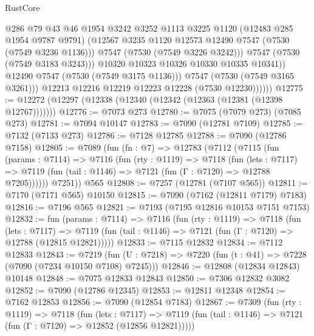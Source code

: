 \begin{lexlean}{RustCore}
\begin{coremodule}
                          @286
                          @79
                          @43
                          @46
                          @1954
                          @3242
                          @3252
                          @1113
                          @3225
                          @1120
                          (@12483 @285 @1954 @9787 @9791)
                          (@12567 @3235 @1120 @12573 @12490 @7547 (@7530 (@7549 @3236 @1136)))
                          @7547
                          (@7530 (@7549 @3226 @3242)))
                        @7547
                        (@7530 (@7549 @3183 @3243)))
                      @10320
                      @10323
                      @10326
                      @10330
                      @10335
                      @10341))
                  @12490
                  @7547
                  (@7530 (@7549 @3175 @1136)))
                @7547
                (@7530 (@7549 @3165 @3261)))
              @12213
              @12216
              @12219
              @12223
              @12228
              (@7530 @12230))))))
@12775 := @12272 (@12297 (@12338 (@12340 (@12342 (@12363 (@12381 (@12398 @12767)))))))
@12776 := @7073 @273
@12780 := @7075 (@7079 @273) (@7085 @273)
@12781 := @7094 @10147
@12783 := @7090 (@12781 @7109)
@12785 := @7132 (@7133 @273)
@12786 := @7128 @12785
@12788 := @7090 (@12786 @7158)
@12805 := @7089
    (fun (fn : @7) =>
    @12783
      (@7112
        (@7115
          (fun (params : @7114) =>
          @7116
            (fun (rty : @1119) =>
            @7118
              (fun (lets : @7117) =>
              @7119 (fun (tail : @1146) => @7121 (fun (Γ : @7120) => @12788 @7205))))))
        @7251))
    @565
@12808 := @7257 (@12781 (@7107 @565))
@12811 := @7170 (@7171 @565) @10150
@12815 := @7090 (@7162 (@12811 @7179) @7183)
@12816 := @7196 @565
@12821 := @7193 (@7195 @12816 @10153 @7151 @7153)
@12832 := fun (params : @7114) =>
  @7116
    (fun (rty : @1119) =>
    @7118
      (fun (lets : @7117) =>
      @7119 (fun (tail : @1146) => @7121 (fun (Γ : @7120) => @12788 (@12815 @12821)))))
@12833 := @7115 @12832
@12834 := @7112 @12833
@12843 := @7219
    (fun (U : @7218) => @7220 (fun (t : @41) => @7228 (@7090 (@7234 @10150 @7108) @7245)))
@12846 := @12808 (@12834 @12843) @10148
@12848 := @7075 @12833 @12843
@12850 := @7306 @12832 @3082
@12852 := @7090 (@12786 @12345)
@12853 := @12811 @12348
@12854 := @7162 @12853
@12856 := @7090 (@12854 @7183)
@12867 := @7309
    (fun (rty : @1119) =>
    @7118
      (fun (lets : @7117) =>
      @7119 (fun (tail : @1146) => @7121 (fun (Γ : @7120) => @12852 (@12856 @12821)))))

\end{coremodule}
\end{lexlean}
